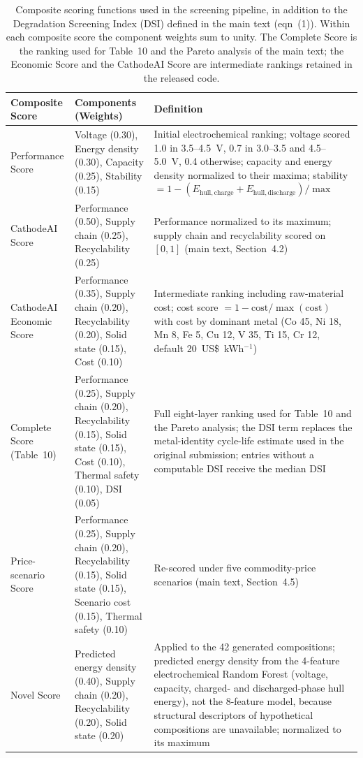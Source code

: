 \documentclass[10pt]{article}
\begin{document}
\begin{table}[htbp]
\centering
\caption{Composite scoring functions used in the screening pipeline, in addition to the Degradation Screening Index (DSI) defined in the main text (eqn~(1)). Within each composite score the component weights sum to unity. The Complete Score is the ranking used for Table~10 and the Pareto analysis of the main text; the Economic Score and the CathodeAI Score are intermediate rankings retained in the released code.}
\label{tab:s2_scores}
\setlength{\tabcolsep}{6pt}
\renewcommand{\arraystretch}{1.3}
\begin{tabular}{p{3.0cm} p{5.0cm} p{6.6cm}}
\hline
\textbf{Composite Score} & \textbf{Components (Weights)} & \textbf{Definition} \\
\hline
Performance Score &
Voltage (0.30), Energy density (0.30), Capacity (0.25), Stability (0.15) &
Initial electrochemical ranking; voltage scored 1.0 in 3.5--4.5~V, 0.7 in 3.0--3.5 and 4.5--5.0~V, 0.4 otherwise; capacity and energy density normalized to their maxima; stability $= 1 - (E_\mathrm{hull,charge}+E_\mathrm{hull,discharge})/\max$ \\[4pt]
CathodeAI Score &
Performance (0.50), Supply chain (0.25), Recyclability (0.25) &
Performance normalized to its maximum; supply chain and recyclability scored on $[0,1]$ (main text, Section~4.2) \\[4pt]
CathodeAI Economic Score &
Performance (0.35), Supply chain (0.20), Recyclability (0.20), Solid state (0.15), Cost (0.10) &
Intermediate ranking including raw-material cost; cost score $= 1 - \mathrm{cost}/\max(\mathrm{cost})$ with cost by dominant metal (Co 45, Ni 18, Mn 8, Fe 5, Cu 12, V 35, Ti 15, Cr 12, default 20~US\$~kWh$^{-1}$) \\[4pt]
Complete Score (Table~10) &
Performance (0.25), Supply chain (0.20), Recyclability (0.15), Solid state (0.15), Cost (0.10), Thermal safety (0.10), DSI (0.05) &
Full eight-layer ranking used for Table~10 and the Pareto analysis; the DSI term replaces the metal-identity cycle-life estimate used in the original submission; entries without a computable DSI receive the median DSI \\[4pt]
Price-scenario Score &
Performance (0.25), Supply chain (0.20), Recyclability (0.15), Solid state (0.15), Scenario cost (0.15), Thermal safety (0.10) &
Re-scored under five commodity-price scenarios (main text, Section~4.5) \\[4pt]
Novel Score &
Predicted energy density (0.40), Supply chain (0.20), Recyclability (0.20), Solid state (0.20) &
Applied to the 42 generated compositions; predicted energy density from the 4-feature electrochemical Random Forest (voltage, capacity, charged- and discharged-phase hull energy), not the 8-feature model, because structural descriptors of hypothetical compositions are unavailable; normalized to its maximum \\
\hline
\end{tabular}
\end{table}
\end{document}
